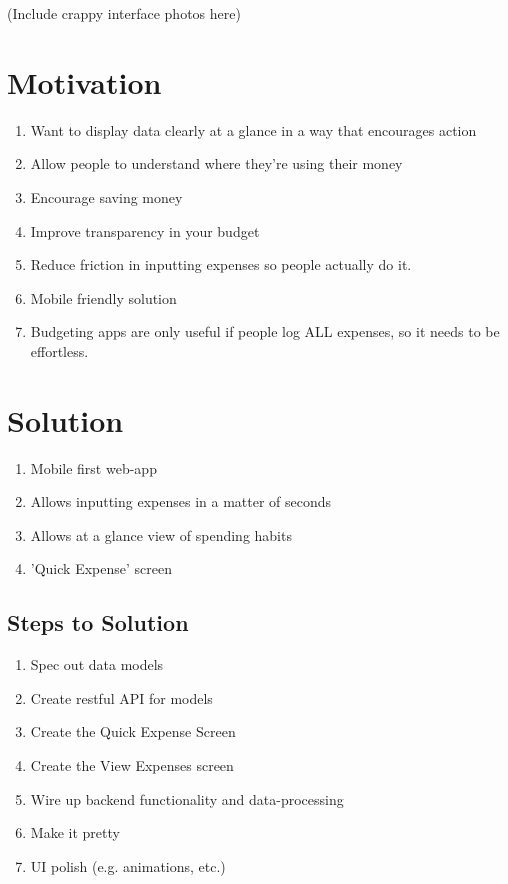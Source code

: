 \documentclass{chi2011}
\begin{document}
(Include crappy interface photos here)

\section{Motivation}

\begin{enumerate}
\item Want to display data clearly at a glance in a way that encourages action
\item Allow people to understand where they're using their money
\item Encourage saving money
\item Improve transparency in your budget
\item Reduce friction in inputting expenses so people actually do it.
\item Mobile friendly solution
\item Budgeting apps are only useful if people log ALL expenses, so it needs to be effortless.
\end{enumerate}

\section{Solution}

\begin{enumerate}
    \item Mobile first web-app
    \item Allows inputting expenses in a matter of seconds
    \item Allows at a glance view of spending habits
    \item 'Quick Expense' screen
\end{enumerate}

\subsection{Steps to Solution}

\begin{enumerate}
    \item Spec out data models
    \item Create restful API for models
    \item Create the Quick Expense Screen
    \item Create the View Expenses screen
    \item Wire up backend functionality and data-processing
    \item Make it pretty
    \item UI polish (e.g. animations, etc.)
\end{enumerate}
\end{document}
